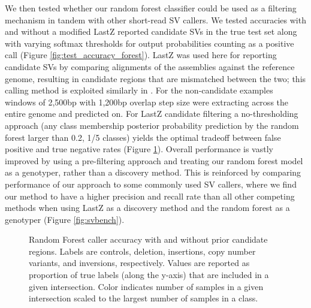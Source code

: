 We then tested whether our random forest classifier could be used as a filtering mechanism in tandem with other short-read SV callers. We tested accuracies with and without a modified LastZ \cite{chakrabortyStructuralVariantsExhibit2019} reported candidate SVs in the true test set along with varying softmax thresholds for output probabilities counting as a positive call (Figure \ref{fig:test_accuracy_forest}). LastZ was used here for reporting candidate SVs by comparing alignments of the assemblies against the reference genome, resulting in candidate regions that are mismatched between the two; this calling method is exploited similarly in \cite{chakrabortyEvolutionGenomeStructure2021}. For the non-candidate examples windows of 2,500bp with 1,200bp overlap step size were extracting across the entire genome and predicted on. For LastZ candidate filtering a no-thresholding approach (any class membership posterior probability prediction by the random forest larger than 0.2, 1/5 classes) yields the optimal tradeoff between false positive and true negative rates (Figure \ref{fig:caller_comparison}). Overall performance is vastly improved by using a pre-filtering approach and treating our random forest model as a genotyper, rather than a discovery method. This is reinforced by comparing performance of our approach to some commonly used SV callers, where we find our method to have a higher precision and recall rate than all other competing methods when using LastZ as a discovery method and the random forest as a genotyper (Figure \ref{fig:svbench}).

\begin{figure}
    \centering
    \caption[Random Forest caller accuracy with and without prior candidate regions.]{Random Forest caller accuracy with and without prior candidate regions. Labels are controls, deletion, insertions, copy number variants, and inversions, respectively. Values are reported as proportion of true labels (along the y-axis) that are included in a given intersection. Color indicates number of samples in a given intersection scaled to the largest number of samples in a class.}
    \label{fig:caller_comparison}
\end{figure}

